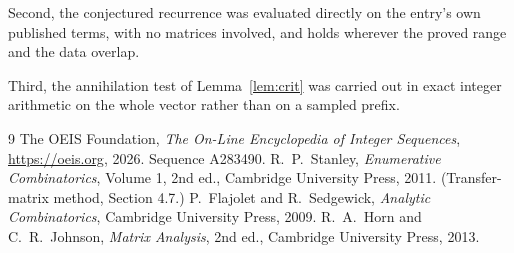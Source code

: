 \documentclass[11pt,a4paper]{article}
\theoremstyle{plain}
\theoremstyle{definition}
\begin{document}
Second, the conjectured recurrence was evaluated directly on the entry's own published terms,
with no matrices involved, and holds wherever the proved range and the data overlap.

Third, the annihilation test of Lemma~\ref{lem:crit} was carried out in exact integer
arithmetic on the whole vector rather than on a sampled prefix.

\begin{thebibliography}{9}
 The OEIS Foundation, \emph{The On-Line Encyclopedia of Integer
Sequences}, \url{https://oeis.org}, 2026. Sequence A283490.
 R.~P.~Stanley, \emph{Enumerative Combinatorics}, Volume 1, 2nd ed.,
Cambridge University Press, 2011. (Transfer-matrix method, Section 4.7.)
 P.~Flajolet and R.~Sedgewick, \emph{Analytic Combinatorics}, Cambridge
University Press, 2009.
 R.~A.~Horn and C.~R.~Johnson, \emph{Matrix Analysis}, 2nd ed., Cambridge
University Press, 2013.
\end{thebibliography}
\end{document}
